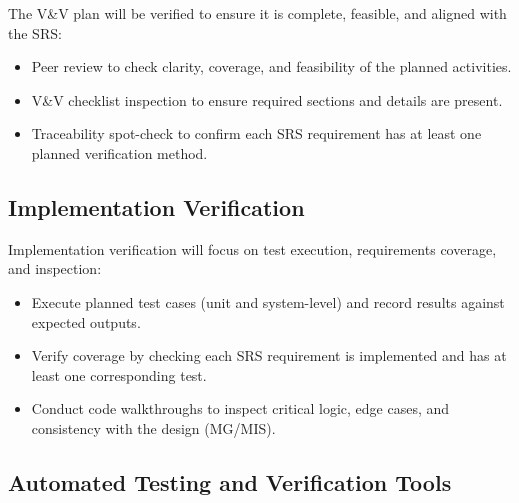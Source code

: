 \documentclass[12pt, titlepage]{article}
\begin{document}
%
%
The V\&V plan will be verified to ensure it is complete, feasible, and aligned
with the SRS:
\begin{itemize}
  \item Peer review to check clarity, coverage, and feasibility of the planned activities.
  \item V\&V checklist inspection to ensure required sections and details are present.
  \item Traceability spot-check to confirm each SRS requirement has at least one planned verification method.
\end{itemize}

\subsection{Implementation Verification}

%
%
Implementation verification will focus on test execution, requirements coverage,
and inspection:
\begin{itemize}
  \item Execute planned test cases (unit and system-level) and record results against expected outputs.
  \item Verify coverage by checking each SRS requirement is implemented and has at least one corresponding test.
  \item Conduct code walkthroughs to inspect critical logic, edge cases, and consistency with the design (MG/MIS).
\end{itemize}

\subsection{Automated Testing and Verification Tools}
\end{document}
